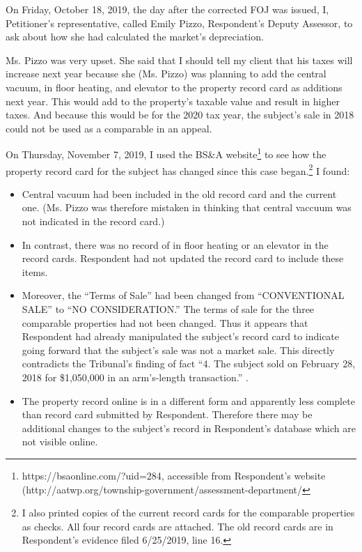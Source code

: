\documentclass[12pt,\documentclassflag]{michiganCourtOfAppealsBrief}
\begin{document}
On Friday, October 18, 2019, the day after the corrected FOJ was issued, I, Petitioner's representative, called Emily Pizzo, Respondent's Deputy Assessor, to ask about how she had calculated the market's depreciation.

Ms. Pizzo was very upset. She said that I should tell my client that his taxes will increase next year because she (Ms. Pizzo) was planning to add the central vacuum, in floor heating, and elevator to the property record card as additions next year. This would add to the property's taxable value and result in higher taxes. And because this would be for the 2020 tax year, the subject's sale in 2018 could not be used as a comparable in an appeal. 

On Thursday, November 7, 2019, I used the BS&A website\footnote{https://bsaonline.com/?uid=284, accessible from   Respondent's website (http://aatwp.org/township-government/assessment-department/}
to see how the property record card for the subject has changed since this case began.\footnote{I also printed copies of the current record cards for the comparable properties as checks. All four record cards are attached. The old record cards are in Respondent's evidence filed 6/25/2019, line 16.} I found:

\begin{itemize}
\item Central vacuum had been included in the old record card and the current one. (Ms. Pizzo was therefore mistaken in thinking that central vaccuum was not indicated in the record card.)
\item In contrast, there was no record of in floor heating or an elevator in the record cards. Respondent had not updated the record card to include these items.
\item Moreover, the ``Terms of Sale'' had been changed from ``CONVENTIONAL SALE'' to ``NO CONSIDERATION.''
  The terms of sale for the three comparable properties %
  had not been changed. Thus it appears that Respondent had already manipulated the subject's record card to indicate going forward that the subject's sale was not a market sale. This directly contradicts the Tribunal's finding of fact ``4. The subject sold on February 28, 2018 for \$1,050,000 in an arm's-length transaction.'' .
\item The property record online is in a different form and apparently less complete than record card submitted by Respondent. Therefore there may be additional changes to the subject's record in Respondent's database which are not visible online.
\end{itemize}
\end{document}
